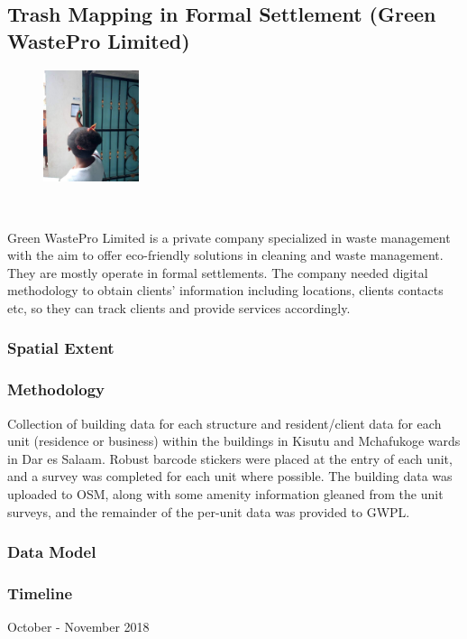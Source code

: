 \documentclass[a4paper,12pt,twoside]{article}
\begin{document}
\newpage
\subsection{Trash Mapping in Formal Settlement (Green WastePro Limited)}

\begin{figure} %
    \centering
    
    \includegraphics[width=0.25\textwidth]{images/Scanning_barcodes.png}
\end{figure}


\

Green WastePro Limited is a private company specialized in waste management with the aim to offer eco-friendly solutions in cleaning and waste management. They are mostly operate in formal settlements. The company needed digital methodology to obtain clients’ information including locations, clients contacts etc, so they can track clients and provide services accordingly.

\subsubsection{Spatial Extent}
\subsubsection{Methodology}
Collection of building data for each structure and resident/client data for each unit (residence or business) within the buildings in Kisutu and Mchafukoge wards in Dar es Salaam. Robust barcode stickers were placed at the entry of each unit, and a survey was completed for each unit where possible. The building data was uploaded to OSM, along with some amenity information gleaned from the unit surveys, and the remainder of the per-unit data was provided to GWPL.
\subsubsection{Data Model}
\subsubsection{Timeline}
October - November 2018
\end{document}
